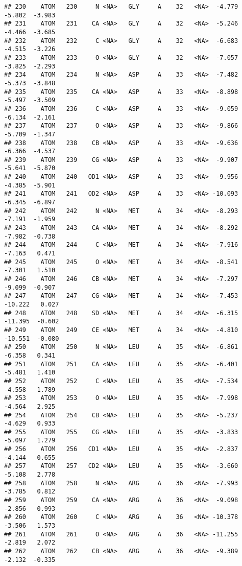 \documentclass[
]{article}
\begin{document}
\begin{verbatim}
## 230    ATOM   230     N <NA>   GLY     A    32   <NA>  -4.779  -5.802  -3.983
## 231    ATOM   231    CA <NA>   GLY     A    32   <NA>  -5.246  -4.466  -3.685
## 232    ATOM   232     C <NA>   GLY     A    32   <NA>  -6.683  -4.515  -3.226
## 233    ATOM   233     O <NA>   GLY     A    32   <NA>  -7.057  -3.825  -2.293
## 234    ATOM   234     N <NA>   ASP     A    33   <NA>  -7.482  -5.373  -3.848
## 235    ATOM   235    CA <NA>   ASP     A    33   <NA>  -8.898  -5.497  -3.509
## 236    ATOM   236     C <NA>   ASP     A    33   <NA>  -9.059  -6.134  -2.161
## 237    ATOM   237     O <NA>   ASP     A    33   <NA>  -9.866  -5.709  -1.347
## 238    ATOM   238    CB <NA>   ASP     A    33   <NA>  -9.636  -6.366  -4.537
## 239    ATOM   239    CG <NA>   ASP     A    33   <NA>  -9.907  -5.641  -5.870
## 240    ATOM   240   OD1 <NA>   ASP     A    33   <NA>  -9.956  -4.385  -5.901
## 241    ATOM   241   OD2 <NA>   ASP     A    33   <NA> -10.093  -6.345  -6.897
## 242    ATOM   242     N <NA>   MET     A    34   <NA>  -8.293  -7.191  -1.959
## 243    ATOM   243    CA <NA>   MET     A    34   <NA>  -8.292  -7.982  -0.738
## 244    ATOM   244     C <NA>   MET     A    34   <NA>  -7.916  -7.163   0.471
## 245    ATOM   245     O <NA>   MET     A    34   <NA>  -8.541  -7.301   1.510
## 246    ATOM   246    CB <NA>   MET     A    34   <NA>  -7.297  -9.099  -0.907
## 247    ATOM   247    CG <NA>   MET     A    34   <NA>  -7.453 -10.222   0.027
## 248    ATOM   248    SD <NA>   MET     A    34   <NA>  -6.315 -11.395  -0.602
## 249    ATOM   249    CE <NA>   MET     A    34   <NA>  -4.810 -10.551  -0.080
## 250    ATOM   250     N <NA>   LEU     A    35   <NA>  -6.861  -6.358   0.341
## 251    ATOM   251    CA <NA>   LEU     A    35   <NA>  -6.401  -5.481   1.410
## 252    ATOM   252     C <NA>   LEU     A    35   <NA>  -7.534  -4.558   1.789
## 253    ATOM   253     O <NA>   LEU     A    35   <NA>  -7.998  -4.564   2.925
## 254    ATOM   254    CB <NA>   LEU     A    35   <NA>  -5.237  -4.629   0.933
## 255    ATOM   255    CG <NA>   LEU     A    35   <NA>  -3.833  -5.097   1.279
## 256    ATOM   256   CD1 <NA>   LEU     A    35   <NA>  -2.837  -4.144   0.655
## 257    ATOM   257   CD2 <NA>   LEU     A    35   <NA>  -3.660  -5.108   2.778
## 258    ATOM   258     N <NA>   ARG     A    36   <NA>  -7.993  -3.785   0.812
## 259    ATOM   259    CA <NA>   ARG     A    36   <NA>  -9.098  -2.856   0.993
## 260    ATOM   260     C <NA>   ARG     A    36   <NA> -10.378  -3.506   1.573
## 261    ATOM   261     O <NA>   ARG     A    36   <NA> -11.255  -2.819   2.072
## 262    ATOM   262    CB <NA>   ARG     A    36   <NA>  -9.389  -2.132  -0.335

\end{verbatim}
\end{document}
